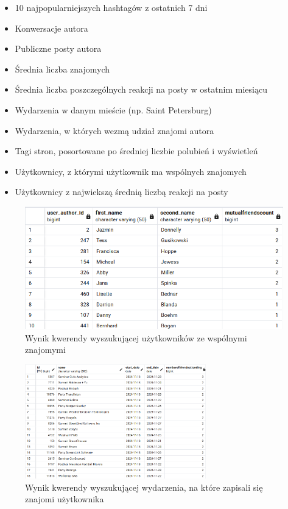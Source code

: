 \documentclass{article}
\begin{document}
\begin{itemize}
    \item 10 najpopularniejszych hashtagów z ostatnich 7 dni
    \item Konwersacje autora
    \item Publiczne posty autora
    \item Średnia liczba znajomych
    \item Średnia liczba poszczególnych reakcji na posty w ostatnim miesiącu
    \item Wydarzenia w danym mieście (np. Saint Petersburg)
    \item Wydarzenia, w których wezmą udział znajomi autora
    \item Tagi stron, posortowane po średniej liczbie polubień i wyświetleń
    \item Użytkownicy, z którymi użytkownik ma wspólnych znajomych
    \item Użytkownicy z najwiekszą średnią liczbą reakcji na posty
\end{itemize}

\begin{figure}[H]
    \centering
    \includegraphics[width=\textwidth]{images/mutual_friends_sql.png}
    \caption{Wynik kwerendy wyszukującej użytkowników ze wspólnymi znajomymi}
    \label{fig:sql_1}
\end{figure}

\begin{figure}[H]
    \centering
    \includegraphics[width=0.7\textwidth]{images/event_mutuals_sql.png}
    \caption{Wynik kwerendy wyszukującej wydarzenia, na które zapisali się znajomi użytkownika}
    \label{fig:sql_2}
\end{figure}
\end{document}
